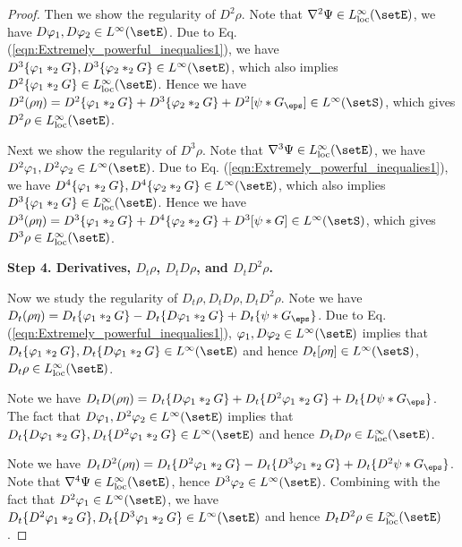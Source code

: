 \documentclass[11pt]{article}
\begin{document}
\begin{proof}
Then we show the regularity of $D^2 \rho$. Note that $\nabla^2 \Psi \in L_{\rm loc}^\infty(\setE)$, we have $D \varphi_1, D \varphi_2 \in L^\infty(\setE)$. Due to Eq. (\ref{eqn:Extremely_powerful_inequalies1}), we have $D^3 \{\varphi_1 *_2 G\}, D^3\{ \varphi_2 *_2 G \} \in L^\infty(\setE)$, which also implies $D^2 \{\varphi_1 *_2 G\} \in L^\infty_{\rm loc}(\setE)$. Hence we have $D^2 (\rho \eta) = D^2 \{\varphi_1 *_2 G\} + D^3\{ \varphi_2 *_2 G \}  +  D^2 [\psi * G_\eps] \in L^\infty(\setS)$, which gives $D^2 \rho \in L^\infty_{\rm loc}(\setE)$. 

Next we show the regularity of $D^3 \rho$. Note that $\nabla^3 \Psi \in  L_{\rm loc}^\infty(\setE)$, we have $D^2 \varphi_1, D^2 \varphi_2 \in L^\infty(\setE)$. Due to Eq. (\ref{eqn:Extremely_powerful_inequalies1}), we have $D^4 \{\varphi_1 *_2 G\}, D^4\{ \varphi_2 *_2 G \} \in L^\infty(\setE)$, which also implies $D^3 \{\varphi_1 *_2 G\} \in L^\infty_{\rm loc}(\setE)$. Hence we have $D^3 (\rho \eta) = D^3 \{\varphi_1 *_2 G\} + D^4\{ \varphi_2 *_2 G \}  +  D^3 [\psi * G] \in L^\infty(\setS)$, which gives $D^3 \rho \in L^\infty_{\rm loc}(\setE)$. 

\noindent
{\bf Step 4. Derivatives, $D_t\rho$, $D_t D \rho$, and $D_t D^2 \rho$.}

Now we study the regularity of $D_t \rho, D_t D \rho, D_t D^2 \rho$. Note we have $D_t (\rho \eta) = D_t\{ \varphi_1 *_2 G \} - D_t \{ D \varphi_1 *_2 G \} + D_t\{\psi * G_\eps\}$. Due to Eq. (\ref{eqn:Extremely_powerful_inequalies1}), $\varphi_1, D \varphi_2 \in L^\infty(\setE)$ implies that $D_t\{ \varphi_1 *_2 G \}, D_t \{ D \varphi_1 *_2 G \} \in L^\infty(\setE)$ and hence $D_t[\rho \eta] \in L^\infty(\setS)$, $D_t \rho \in L^\infty_{\rm loc}(\setE)$. 

Note we have $D_t D(\rho\eta) = D_t\{ D\varphi_1 *_2 G \} + D_t \{ D^2 \varphi_1 *_2 G \} + D_t\{D \psi * G_\eps\}$. The fact that $D\varphi_1, D^2 \varphi_2 \in L^\infty(\setE)$ implies that $D_t\{ D \varphi_1 *_2 G \}, D_t \{ D^2 \varphi_1 *_2 G \} \in L^\infty(\setE)$ and hence $D_t D \rho \in L^\infty_{\rm loc}(\setE)$. 

Note we have $D_t D^2(\rho\eta) = D_t\{ D^2\varphi_1 *_2 G \} - D_t \{ D^3 \varphi_1 *_2 G \} + D_t\{D^2 \psi * G_\eps\}$. Note that $\nabla^4 \Psi \in L_{\rm loc}^\infty(\setE)$, hence $D^3 \varphi_2 \in L^\infty(\setE)$. Combining with the fact that $D^2\varphi_1 \in L^\infty(\setE)$, we have $D_t\{ D^2 \varphi_1 *_2 G \}, D_t \{ D^3 \varphi_1 *_2 G \} \in L^\infty(\setE)$ and hence $D_t D^2 \rho \in L^\infty_{\rm loc}(\setE)$. 



\end{proof}
\end{document}
